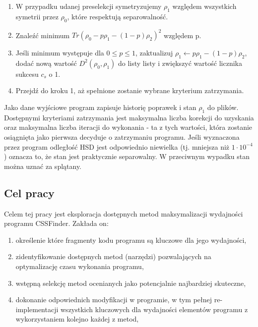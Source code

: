 \documentclass[11pt, a4paper]{article}
\begin{document}
\begin{sloppypar}
\begin{enumerate}
      \item W przypadku udanej preselekcji symetryzujemy $\rho_{1}$ względem wszystkich symetrii
        przez $\rho_{0}$, które respektują separowalność.

      \item Znaleźć minimum $Tr(\rho_{0}- p\rho_{1}- (1 - p)\rho_{2})^{2}$ względem p.

      \item Jeśli minimum występuje dla $0 \le p \le 1$, zaktualizuj
        $\rho_{1}\leftarrow p\rho_{1}- (1 - p)\rho_{2}$, dodać nową wartość $D^{2}(\rho_{0}
        , \rho_{1})$ do listy listy i zwiększyć wartość licznika sukcesu $c_{s}$ o 1.

      \item Przejdź do kroku 1, aż spełnione zostanie wybrane kryterium zatrzymania.
    \end{enumerate}

    Jako dane wyjściowe program zapisuje historię poprawek i stan $\rho_{1}$ do plików.
    Dostępnymi kryteriami zatrzymania jest maksymalna liczba korekcji do uzyskania oraz
    maksymalna liczba iteracji do wykonania - ta z tych wartości, która zostanie osiągnięta
    jako pierwsza decyduje o zatrzymaniu programu. Jeśli wyznaczona przez program
    odległość HSD jest odpowiednio niewielka (tj. mniejsza niż $1 \cdot 10^{-4}$) oznacza
    to, że stan jest praktycznie separowalny. W przeciwnym wypadku stan można uznać za splątany.

    \subsection{Cel pracy}
    Celem tej pracy jest eksploracja dostępnych metod maksymalizacji wydajności programu
    CSSFinder. Zakłada on:
    \begin{enumerate}
      \item określenie które fragmenty kodu programu są kluczowe dla jego wydajności,

      \item zidentyfikowanie dostępnych metod (narzędzi) pozwalających na optymalizację czasu
        wykonania programu,

      \item wstępną selekcję metod ocenianych jako potencjalnie najbardziej skuteczne,

      \item dokonanie odpowiednich modyfikacji w programie, w tym pełnej re-implementacji
        wszystkich kluczowych dla wydajności elementów programu z wykorzystaniem kolejno
        każdej z metod,


\end{enumerate}
\end{sloppypar}
\end{document}
